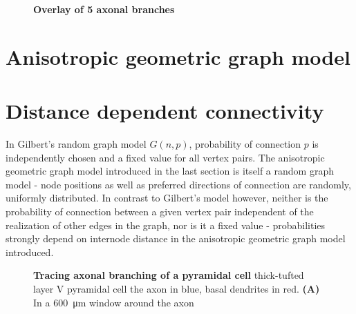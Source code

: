 \vspace{0.5cm}
\begin{figure}[h] 
  \centering 
    \caption{\textbf{Overlay of 5 axonal branches}}%
  \label{fig:axon_heat}
\end{figure}





\newpage
\section{Anisotropic geometric graph model}\label{sec:network_model}

\newpage
\section{Distance dependent connectivity}\label{sec:dist_depend_con}

In Gilbert's random graph model $G(n,p)$, 
probability of connection $p$ is independently chosen and a fixed
value for all vertex pairs. The anisotropic geometric graph model
introduced in the last %
section is itself a random graph model - node positions as well as
preferred directions of connection are randomly, uniformly
distributed. In contrast to Gilbert's model however, neither is the
probability of connection between a given vertex pair independent of
the realization of other edges in the graph, nor is it a fixed value -
probabilities strongly depend on internode distance in the
anisotropic geometric graph model introduced.

\vspace{0.5cm}
\begin{figure}[h] 
  \centering 

  \caption{\textbf{Tracing axonal branching of a pyramidal cell}
    \newline 
    thick-tufted layer V pyramidal cell the axon in blue, basal
    dendrites in red.  
    \textbf{(A)} In a \SI{600}{\micro\meter} window around the axon}%
   
  
    

 
  \label{fig:romand_traced}
\end{figure}

